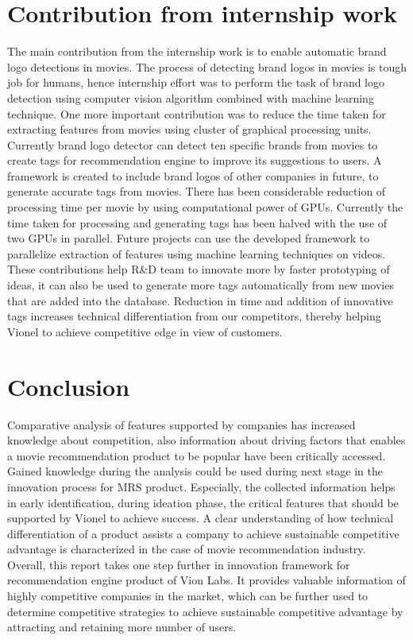 \section{Contribution from internship work}
   The main contribution from the internship work is to enable automatic brand logo detections in movies. The process of detecting brand logos in movies is tough job for humans, hence internship effort was to perform the task of brand logo detection using computer vision algorithm combined with machine learning technique. One more important contribution was to reduce the time taken for extracting features from movies using cluster of graphical processing units. Currently brand logo detector can detect ten specific brands from movies to create tags for recommendation engine to improve its suggestions to users. A framework is created to include brand logos of other companies in future, to generate accurate tags from movies. There has been considerable reduction of processing time per movie by using computational power of GPUs. Currently the time taken for processing and generating tags has been halved with the use of two GPUs in parallel. Future projects can use the developed framework to parallelize extraction of features using machine learning techniques on videos. These contributions help R\&D team to innovate more by faster prototyping of ideas, it can also be used to generate more tags automatically from new movies that are added into the database. Reduction in time and addition of innovative tags increases technical differentiation from our competitors, thereby helping Vionel to achieve competitive edge in view of customers.        

\section{Conclusion}
   Comparative analysis of features supported by companies has increased knowledge about competition, also information about driving factors that enables a movie recommendation product to be popular have been critically accessed. Gained knowledge during the analysis could be used during next stage in the innovation process for \acrshort{MRS} product. Especially, the collected information helps in early identification, during ideation phase, the critical features that should be supported by Vionel to achieve success. A clear understanding of how technical differentiation of a product assists a company to achieve sustainable competitive advantage is characterized in the case of movie recommendation industry. Overall, this report takes one step further in innovation framework for recommendation engine product of Vion Labs. It provides valuable information of highly competitive companies in the market, which can be further used to determine competitive strategies to achieve sustainable competitive advantage by attracting and retaining more number of users.